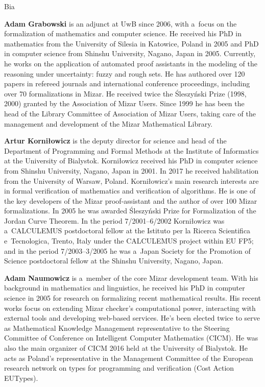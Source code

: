 \begin{sitedescription}{Bia}
\begin{compactitem}
\item\textbf{Adam Grabowski} is an adjunct at UwB since 2006, 
with a~focus on the formalization of mathematics and computer science.
He received his PhD in mathematics from the University of Silesia in Katowice, Poland in 2005 
and PhD in computer science from Shinshu University, Nagano, Japan in 2005.
Currently, he works on the application of automated proof assistants
in the modeling of the reasoning under uncertainty: fuzzy and rough sets.
He has authored over 120 papers in refereed journals and international conference
proceedings, including over 70 formalizations in Mizar.
He received twice the Śleszyński Prize (1998, 2000) granted by the Association of Mizar Users.
Since 1999 he has been the head of the Library Committee of Association of Mizar Users, taking care of
the management and development of the Mizar Mathematical Library.

\item\textbf{Artur Korniłowicz} is the deputy director for science 
and head of the Department of Programming and Formal Methods
at the Institute of Informatics at the University of Bialystok.
Korniłowicz received his PhD in computer science from Shinshu University, Nagano, Japan in 2001.
In 2017 he received habilitation from the University of Warsaw, Poland.
Korniłowicz's main research interests are in formal verification of mathematics and verification of algorithms.
He is one of the key developers of the Mizar proof-assistant and the author of over 100 Mizar formalizations.
In 2005 he was awarded Śleszyński Prize for Formalization of the Jordan Curve Theorem.
In the period 7/2001--6/2002 Korniłowicz was a~CALCULEMUS postdoctoral fellow
at the Istituto per la Ricerca Scientifica e~Tecnologica, Trento, Italy under the CALCULEMUS project within EU FP5;
and in the period 7/2003--3/2005 he was a~Japan Society for the Promotion of Science 
postdoctoral fellow at the Shinshu University, Nagano, Japan.

\item\textbf{Adam Naumowicz} is a~member of the core Mizar development team. 
With his background in mathematics and linguistics, he received his PhD in computer science in 2005
for research on formalizing recent mathematical results. His recent works focus on extending Mizar checker's computational power, 
interacting with external tools and developing web-based services. 
He's been elected twice to serve as Mathematical Knowledge Management representative to the Steering Committee
of Conference on Intelligent Computer Mathematics (CICM).
He was also the main organizer of CICM 2016 held at the University of Bialystok. 
He acts as Poland's representative in the Management Committee of the European research network on types
 for programming and verification (Cost Action EUTypes).


\end{compactitem}
\end{sitedescription}
